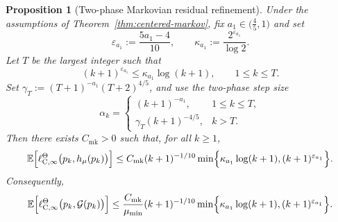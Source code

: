 \documentclass{article}
\newtheorem{proposition}[theorem]{Proposition}
\newcommand{\E}{\mathbb{E}}
\begin{document}
\begin{proposition}[Two-phase Markovian residual refinement]\label{prop:centered-markov-two-phase}
Under the assumptions of Theorem~\ref{thm:centered-markov}, fix $a_1 \in \bigl(\frac45,1\bigr)$ and set
\begin{equation}
\varepsilon_{a_1}:=\frac{5a_1-4}{10},\qquad \kappa_{a_1}:=\frac{2^{\varepsilon_{a_1}}}{\log 2}.
\end{equation}
Let $T$ be the largest integer such that
\begin{equation}\label{eq:markov-two-phase-threshold}
(k+1)^{\varepsilon_{a_1}}\le \kappa_{a_1}\log(k+1),\qquad 1\le k\le T.
\end{equation}
Set $\gamma_T:=(T+1)^{-a_1}(T+2)^{4/5}$, and use the two-phase step size
\begin{equation}\label{eq:markov-two-phase-stepsize}
\alpha_k =
\begin{cases}
(k+1)^{-a_1}, & 1\le k\le T,\\
\gamma_T(k+1)^{-4/5}, & k>T.
\end{cases}
\end{equation}
Then there exists $C_{\mathrm{mk}} >0$ such that, for all $k\ge1$,
\begin{equation}
\E\Bigl[\ell^\Theta_{\mathrm C,\infty}\bigl(p_k,h_\mu(p_k)\bigr)\Bigr] \le C_{\mathrm{mk}}(k+1)^{-1/10} \min\Bigl\{\kappa_{a_1}\log(k+1),(k+1)^{\varepsilon_{a_1}}\Bigr\}.
\end{equation}
Consequently,
\begin{equation}
\E\Bigl[\ell^\Theta_{\mathrm C,\infty}\bigl(p_k,\mathcal G(p_k)\bigr)\Bigr] \le \frac{C_{\mathrm{mk}}}{\mu_{\min}}(k+1)^{-1/10} \min\Bigl\{\kappa_{a_1}\log(k+1),(k+1)^{\varepsilon_{a_1}}\Bigr\}.
\end{equation}
\end{proposition}
\end{document}
